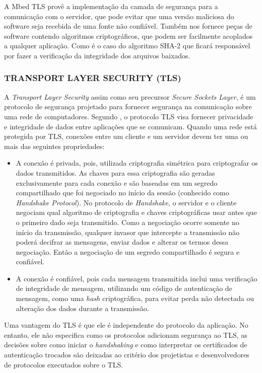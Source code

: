A Mbed TLS provê a implementação da camada de segurança para a comunicação com o servidor, que pode evitar que uma versão maliciosa do software seja recebida de uma fonte não confiável. Também nos fornece peças de software contendo algoritmos criptográficos, que podem ser facilmente acoplados a qualquer aplicação. Como é o caso do algoritmo SHA-2 que ficará responsável por fazer a verificação da integridade dos arquivos baixados.

\subsubsection{TRANSPORT LAYER SECURITY (TLS)}

A \textit{Transport Layer Security} assim como seu precursor \textit{Secure Sockets Layer}, é um protocolo de segurança projetado para fornecer segurança na comunicação sobre uma rede de computadores.
Segundo , o protocolo TLS visa fornecer privacidade e integridade de dados entre aplicações que se comunicam. Quando uma rede está protegida por TLS, conexões entre um cliente e um servidor devem ter uma ou mais das seguintes propriedades:

\begin{itemize}
    \item A conexão é privada, pois, utilizada criptografia simétrica para criptografar os dados transmitidos. As chaves para essa criptografia são geradas exclusivamente para cada conexão e são baseadas em um segredo compartilhado que foi negociado no início da sessão (conhecido como \textit{Handshake Protocol}). No protocolo de \textit{Handshake}, o servidor e o cliente negociam qual algoritmo de criptografia e chaves criptográficas usar antes que o primeiro dado seja transmitido. Como a negociação ocorre somente no início da transmissão, qualquer invasor que intercepte a transmissão não poderá decifrar as mensagens, enviar dados e alterar os termos dessa negociação. Então a negociação de um segredo compartilhado é segura  e confiável.
    \item A conexão é confiável, pois cada mensagem transmitida inclui uma verificação de integridade de mensagem, utilizando um código de autenticação de mensagem, como uma \textit{hash} criptográfica, para evitar perda não detectada ou alteração dos dados durante a transmissão.
\end{itemize}

Uma vantagem do TLS é que ele é independente do protocolo da aplicação. No entanto, ele não especifica como os protocolos adicionam segurança ao TLS, as decisões sobre como iniciar o \textit{handshaking} e como interpretar os certificados de autenticação trocados são deixadas ao critério dos projetistas e desenvolvedores de protocolos executados sobre o TLS.

